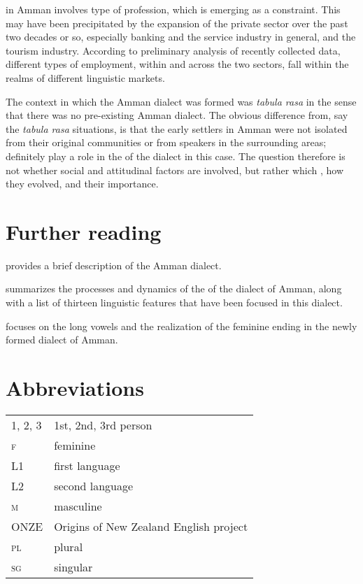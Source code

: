 \documentclass[output=paper]{langsci/langscibook}
\begin{document}
in Amman involves type of profession, which is emerging as a constraint. This may have been precipitated by the expansion of the private sector over the past two decades or so, especially banking and the service industry in general, and the tourism industry. According to preliminary analysis of recently collected data, different types of employment, within and across the two sectors, fall within the realms of different linguistic markets.

The context in which the Amman dialect was formed was \textit{tabula rasa} in the sense that there was no pre-existing Amman dialect. The obvious difference from, say the \textit{tabula rasa}  situations, is that the early settlers in Amman were not isolated from their original communities or from  speakers in the surrounding areas;  definitely play a role in the  of the dialect in this case. The question therefore is not whether social and attitudinal factors are involved, but rather which , how they evolved, and their  importance.

\section*{Further reading}
\begin{furtherreading}
\item[\citet{Al-Wer2011Amman}] provides a brief description of the Amman dialect.
\item[\citet{Al-Wer2007}] summarizes the processes and dynamics of the  of the dialect of Amman, along with a list of thirteen linguistic features that have been focused in this dialect.
\item[\citet{Al-Wer2002furtherreading}] focuses on the long vowels and the realization of the feminine ending in the newly formed dialect of Amman.
\end{furtherreading}

\section*{Abbreviations}

\begin{tabularx}{1\textwidth}{@{}lQ@{}}
\textsc{1, 2, 3} & 1st, 2nd, 3rd person \\
\textsc{f}  &  feminine\\
L1 & first language \\
L2 & second language \\
\textsc{m}  &  masculine\\
ONZE & Origins of New Zealand {English} project \\
\textsc{pl}  &  plural\\
\textsc{sg}  &  singular\\
\end{tabularx}%


{\sloppy\printbibliography[heading=subbibliography,notkeyword=this]}
\end{document}
